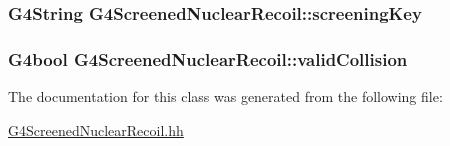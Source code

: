 \subsubsection[{\texorpdfstring{screening\+Key}{screeningKey}}]{\setlength{\rightskip}{0pt plus 5cm}G4\+String G4\+Screened\+Nuclear\+Recoil\+::screening\+Key\hspace{0.3cm}{\ttfamily [protected]}}\hypertarget{classG4ScreenedNuclearRecoil_a297640f55e7819423579c1123501123d}{}\label{classG4ScreenedNuclearRecoil_a297640f55e7819423579c1123501123d}
\subsubsection[{\texorpdfstring{valid\+Collision}{validCollision}}]{\setlength{\rightskip}{0pt plus 5cm}G4bool G4\+Screened\+Nuclear\+Recoil\+::valid\+Collision\hspace{0.3cm}{\ttfamily [protected]}}\hypertarget{classG4ScreenedNuclearRecoil_a995a78de62358db496505ab0f39de0a1}{}\label{classG4ScreenedNuclearRecoil_a995a78de62358db496505ab0f39de0a1}


The documentation for this class was generated from the following file\+:\begin{DoxyCompactItemize}
\item 
\hyperlink{G4ScreenedNuclearRecoil_8hh}{G4\+Screened\+Nuclear\+Recoil.\+hh}\end{DoxyCompactItemize}
